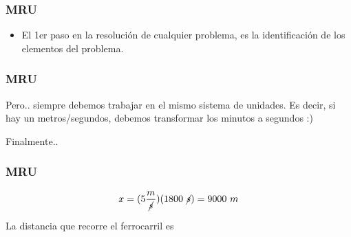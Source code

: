\documentclass{beamer}
\begin{document}
\begin{frame}
\frametitle{MRU}


\begin{itemize}
\item El 1er paso en la resoluci\'on de cualquier problema, es la
identificaci\'on de los elementos del problema.
\end{itemize}


\end{frame}

\begin{frame}
\frametitle{MRU}
{\huge \xmru}

Pero.. siempre debemos trabajar en el mismo sistema de unidades.
Es decir, si hay un metros/segundos,
debemos transformar los 
minutos a segundos :)

\begin{center}
\end{center}

Finalmente..
\end{frame}

\begin{frame}
\frametitle{MRU}
{\large
\begin{equation}
x=
(5\frac{m}{\cancel{s}})
(1800~\cancel{s})=
9000~m
\end{equation}}

La distancia que recorre el ferrocarril es
\end{frame}
\end{document}
